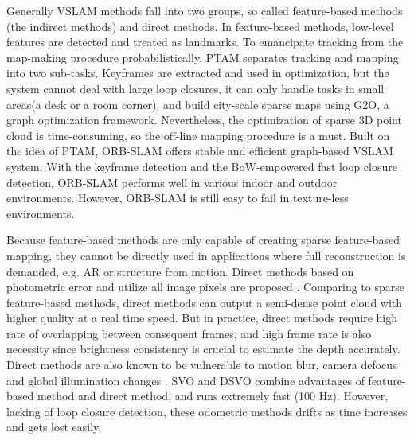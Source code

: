\documentclass[journal]{IEEEtran}
\begin{document}
Generally VSLAM methods fall into two groups, so called feature-based methods (the indirect methods) and direct methods. 
In feature-based methods, low-level features are detected and treated as landmarks. 
To emancipate tracking from the map-making procedure probabilistically, PTAM\cite{Klein2007Parallel} separates tracking and mapping into two sub-tasks.
Keyframes are extracted and used in optimization, but the system cannot deal with large loop closures, it can only handle tasks in small areas(a desk or a room corner). 
\cite{Lategahn2012City} and \cite{Lategahn2014Vision} build city-scale sparse maps using G2O, a graph optimization framework\citep{K2011G2o}. 
Nevertheless, the optimization of sparse 3D point cloud is time-consuming, so the off-line mapping procedure is a must. Built on the idea of PTAM\cite{Klein2007Parallel}, ORB-SLAM \cite{Mur2017ORB} offers stable and efficient graph-based VSLAM system.
With the keyframe detection and the BoW-empowered fast loop closure detection, ORB-SLAM performs well in various indoor and outdoor environments. 
However, ORB-SLAM is still easy to fail in texture-less environments.

%

Because feature-based methods are only capable of creating sparse feature-based mapping, they cannot be directly used in applications where full reconstruction is demanded, e.g. AR or structure from motion.
Direct methods based on photometric error and utilize all image pixels are proposed \citep{Engel2014LSD}.
Comparing to sparse feature-based methods, direct methods can output a semi-dense point cloud with higher quality at a real time speed. 
But in practice, direct methods require high rate of overlapping between consequent frames, and high frame rate is also necessity since brightness consistency is crucial to estimate the depth accurately.
Direct methods are also known to be vulnerable to motion blur, camera defocus and global illumination changes \cite{Newcombe2011DTAM}. 
SVO \cite{Forster2013SVO} and DSVO \cite{} combine advantages of feature-based method and direct method, and runs extremely fast (100 Hz). 
However, lacking of loop closure detection, these odometric methods drifts as time increases and gets lost easily.
	
\end{document}

